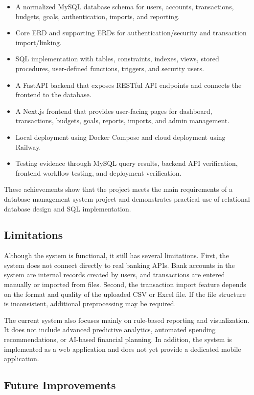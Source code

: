 ﻿\documentclass{article}
\begin{document}
\begin{itemize}
    \item A normalized MySQL database schema for users, accounts, transactions, budgets, goals, authentication, imports, and reporting.
    \item Core ERD and supporting ERDs for authentication/security and transaction import/linking.
    \item SQL implementation with tables, constraints, indexes, views, stored procedures, user-defined functions, triggers, and security users.
    \item A FastAPI backend that exposes RESTful API endpoints and connects the frontend to the database.
    \item A Next.js frontend that provides user-facing pages for dashboard, transactions, budgets, goals, reports, imports, and admin management.
    \item Local deployment using Docker Compose and cloud deployment using Railway.
    \item Testing evidence through MySQL query results, backend API verification, frontend workflow testing, and deployment verification.
\end{itemize}

These achievements show that the project meets the main requirements of a database management system project and demonstrates practical use of relational database design and SQL implementation.

\subsection{Limitations}

Although the system is functional, it still has several limitations. First, the system does not connect directly to real banking APIs. Bank accounts in the system are internal records created by users, and transactions are entered manually or imported from files. Second, the transaction import feature depends on the format and quality of the uploaded CSV or Excel file. If the file structure is inconsistent, additional preprocessing may be required.

The current system also focuses mainly on rule-based reporting and visualization. It does not include advanced predictive analytics, automated spending recommendations, or AI-based financial planning. In addition, the system is implemented as a web application and does not yet provide a dedicated mobile application.

\subsection{Future Improvements}
\end{document}
